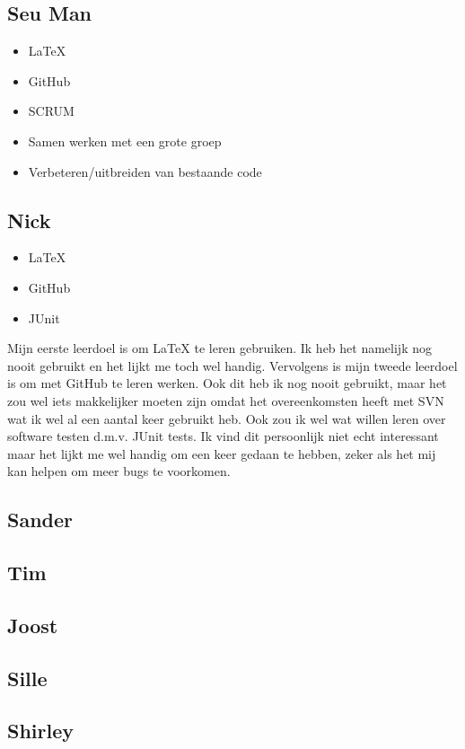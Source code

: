 \documentclass{article}
\begin{document}
\subsection*{Seu Man}
\begin{itemize}
	\item \LaTeX
	\item GitHub
	\item SCRUM
	\item Samen werken met een grote groep
	\item Verbeteren/uitbreiden van bestaande code
\end{itemize}

\subsection*{Nick}
\begin{itemize}
	\item \LaTeX
	\item GitHub
	\item JUnit
\end{itemize} 
Mijn eerste leerdoel is om \LaTeX{} te leren gebruiken. Ik heb het namelijk nog nooit gebruikt en het lijkt me toch wel handig. Vervolgens is mijn tweede leerdoel is om met GitHub te leren werken. Ook dit heb ik nog nooit gebruikt,  maar het zou wel iets makkelijker moeten zijn omdat het overeenkomsten heeft met SVN wat ik wel al
een aantal keer gebruikt heb. Ook zou ik wel wat willen leren over software testen d.m.v. JUnit tests. Ik vind dit persoonlijk niet echt interessant maar het lijkt me wel handig om een keer gedaan te hebben, zeker als het mij kan helpen om  meer bugs te voorkomen.

\subsection*{Sander}
\subsection*{Tim}
\subsection*{Joost}
\subsection*{Sille}
\subsection*{Shirley}
\end{document}
